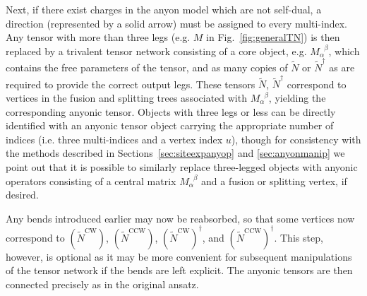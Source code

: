 \documentclass[aps,prb,reprint,superscriptaddress,amsfonts,amsmath,amssymb,showpacs,floatfix]{revtex4-1}
\newcommand{\mrm}[1]{\mathrm{#1}}
\newcommand{\fref}[1]{Fig.~\ref{#1}}
\newcommand{\sref}[1]{Sec.~\ref{#1}}
\newcommand{\p}[1]{\phantom{#1}}
\newcommand{\Mop}{M_\alpha^{\p{\alpha}\beta}}
\newcommand{\alphabeta}{_\alpha^{\p{\alpha}\beta}}
\begin{document}
Next, if there exist charges in the anyon model which are not self-dual, a direction (represented by a solid arrow) must be assigned to every multi-index. Any tensor with more than three legs (e.g. $M$ in \fref{fig:generalTN}) is then replaced by %
a trivalent tensor network
consisting of a core object, e.g. $M\alphabeta$, which contains the free parameters of the tensor, and as many copies of $\tilde N$ or $\tilde N^\dagger$ as are required to provide the correct output legs. 
These tensors $\tilde N$, $\tilde N^\dagger$ %
correspond to vertices in the fusion and splitting trees associated with $M\alphabeta$, yielding the corresponding anyonic tensor. Objects with three legs or less can be directly identified with an anyonic tensor object carrying the appropriate number of indices (i.e. three multi-indices and a vertex index $u$), though for consistency with the methods described in Sections~\ref{sec:siteexpanyop} and \ref{sec:anyonmanip} we point out that it is possible to similarly replace three-legged objects with anyonic operators consisting of a central matrix $\Mop$ and a fusion or splitting vertex, if desired.

Any bends introduced earlier may now be reabsorbed, so that some vertices now correspond to $(\tilde N^\mrm{CW})$, $(\tilde N^\mrm{CCW})$, $(\tilde N^\mrm{CW})^\dagger$, and $(\tilde N^\mrm{CCW})^\dagger$. This step, however, is optional as it may be more convenient for subsequent manipulations of the tensor network if the bends are left explicit. 
The anyonic tensors are 
then connected precisely as in the original ansatz. %
\end{document}
